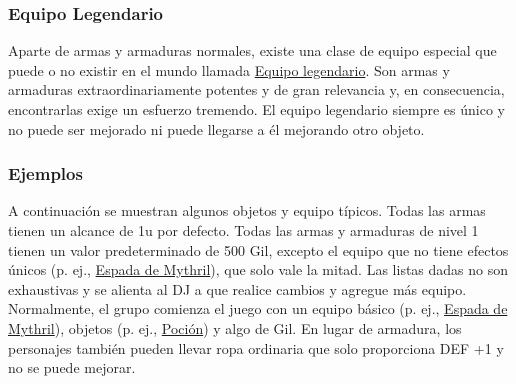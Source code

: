 \subsubsection*{Equipo Legendario}
Aparte de armas y armaduras normales, existe una clase de equipo especial que puede o no existir en el mundo llamada \hyperlink{leq}{Equipo legendario}. Son armas y armaduras extraordinariamente potentes y de gran relevancia y, en consecuencia, encontrarlas exige un esfuerzo tremendo. El equipo legendario siempre es único y no puede ser mejorado ni puede llegarse a él mejorando otro objeto.
%
\vfill
%
\subsubsection*{Ejemplos}
A continuación se muestran algunos objetos y equipo típicos. Todas las armas tienen un alcance de 1u por defecto. Todas las armas y armaduras de nivel 1 tienen un valor predeterminado de 500 Gil, excepto el equipo que no tiene efectos únicos (p. ej., \hyperlink{mknife}{Espada de Mythril}), que solo vale la mitad. Las listas dadas no son exhaustivas y se alienta al DJ a que realice cambios y agregue más equipo. Normalmente, el grupo comienza el juego con un equipo básico (p. ej., \hyperlink{mknife}{Espada de Mythril}), objetos (p. ej., \hyperlink{item}{Poción}) y algo de Gil. En lugar de armadura, los personajes también pueden llevar ropa ordinaria que solo proporciona DEF +1 y no se puede mejorar.
%
\pagebreak
%





